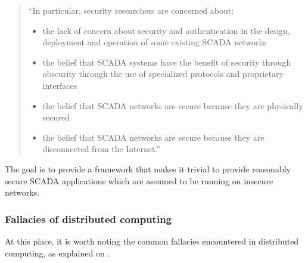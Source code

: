 \begin{quote}
``In particular, security researchers are concerned about:
	\begin{itemize}
		\item the lack of concern about security and authentication in
			the design, deployment and operation of some existing
			SCADA networks
		\item the belief that SCADA systems have the benefit of
			security through obscurity through the use of
			specialized protocols and proprietary interfaces
		\item the belief that SCADA networks are secure because they
			are physically secured
		\item the belief that SCADA networks are secure because they
			are disconnected from the Internet.''
	\end{itemize}
\end{quote}

The goal is to provide a framework that makes it trivial to provide reasonably
secure SCADA applications which are assumed to be running on insecure networks.

\subsubsection{Fallacies of distributed computing}
At this place, it is worth noting the common fallacies encountered in
distributed computing, as explained on \cite{dcomp:fallacies}.


